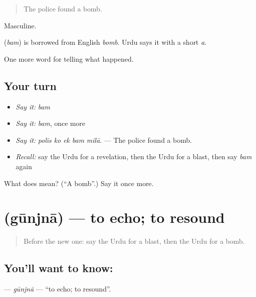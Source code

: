 \begin{quote}
The police found a bomb.
\end{quote}

Masculine.

\begin{cousinweb}
\textbf{} (\emph{bam}) is borrowed from English \emph{bomb}. Urdu says it with a short \emph{a}.
\end{cousinweb}

\begin{grammarlens}[title={What you've built}]
One more word for telling what happened.
\end{grammarlens}

\subsection*{Your turn}
\begin{itemize}
\raggedright
  \item \emph{Say it:} \emph{bam}
  \item \emph{Say it:} \emph{bam}, once more
  \item \emph{Say it:} \emph{polīs ko ek bam milā.} — The police found a bomb.
  \item \emph{Recall:} say the Urdu for a revelation, then the Urdu for a blast, then say \emph{bam} again
\end{itemize}

\begin{tcolorbox}[breakable,colback=teal!4,colframe=teal!35!black,title={Before you move on}]
What does  mean? (\textquotedblleft{}A bomb\textquotedblright{}.) Say it once more.
\end{tcolorbox}
\section[\texorpdfstring{\ur{گونجنا} (gūnjnā)}{گونجنا (gūnjnā)}]{ (gūnjnā) — to echo; to resound}

\label{lesson:UR-C306-gunjna}



\begin{quote}
Before the new one: say the Urdu for a blast, then the Urdu for a bomb.
\end{quote}

\subsection*{You'll want to know: }
\textbf{} — \emph{gūnjnā} — \textquotedblleft{}to echo; to resound\textquotedblright{}.

